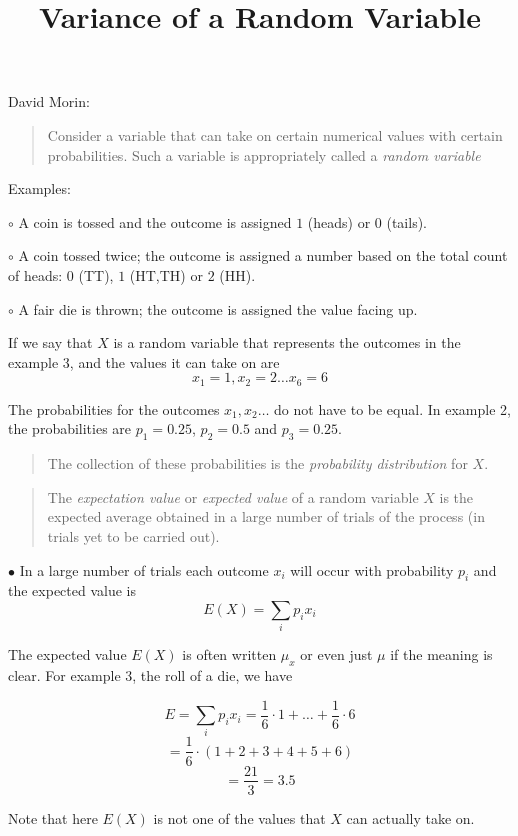 \documentclass[11pt, oneside]{article}   	%
\title{Variance of a Random Variable}
\date{}							%
\begin{document}
\maketitle
\Large
David Morin:
\begin{quote}\color{blue}Consider a variable that can take on certain numerical values with certain probabilities.  Such a variable is appropriately called a \emph{random variable}\color{black}\end{quote}

Examples:

$\circ$ A coin is tossed and the outcome is assigned $1$ (heads) or $0$ (tails).

$\circ$ A coin tossed twice; the outcome is assigned a number based on the total count of heads:  $0$ (TT), $1$ (HT,TH) or $2$ (HH).

$\circ$ A fair die is thrown;  the outcome is assigned the value facing up.

If we say that $X$ is a random variable that represents the outcomes in the example 3, and the values it can take on are
\[ x_1 = 1, x_2 = 2 \dots x_6 = 6 \]

The probabilities for the outcomes $x_1, x_2 \dots$ do not have to be equal.  In example 2, the probabilities are $p_1 = 0.25$, $p_2 = 0.5$ and $p_3 = 0.25$.

\begin{quote}\color{blue}The collection of these probabilities is the \emph{probability distribution} for $X$.\end{quote}

\begin{quote}The \emph{expectation value} or \emph{expected value} of a random variable $X$ is the expected average obtained in a large number of trials of the process (in trials yet to be carried out).\color{black}\end{quote}

$\bullet$ In a large number of trials each outcome $x_i$ will occur with probability $p_i$ and the expected value is
\[ E(X) = \sum_i p_i x_i  \]

The expected value $E(X)$ is often written $\mu_x$ or even just $\mu$ if the meaning is clear.  For example 3, the roll of a die, we have

\[ E = \sum_i p_i x_i = \frac{1}{6} \cdot 1 + \dots + \frac{1}{6} \cdot 6  \]
\[ = \frac{1}{6} \cdot (1 + 2 + 3 + 4 + 5 + 6 ) \]
\[ = \frac{21}{3} = 3.5 \]

Note that here $E(X)$ is not one of the values that $X$ can actually take on.
\end{document}
